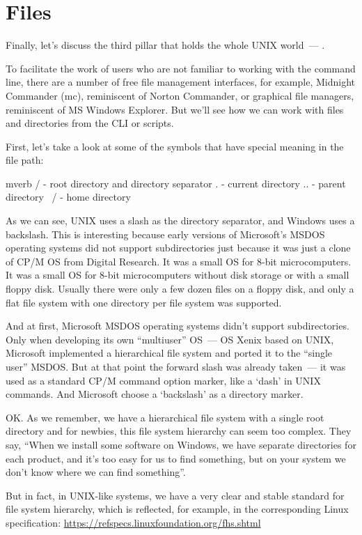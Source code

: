 \section*{Files}

Finally, let's discuss the third pillar that holds the whole UNIX world~---
.

To facilitate the work of users who are not familiar to working with
the command line, there are a number of free file management interfaces,
for example, Midnight Commander (mc), reminiscent of Norton Commander, or
graphical file managers, reminiscent of MS Windows Explorer. But we'll see
how we can work with files and directories from the CLI or scripts.

First, let's take a look at some of the symbols that have special meaning
in the file path:
\begin{code}{mverb}
/    - root directory and directory separator
.    - current directory
..  - parent directory
~/  - home directory
\end{code}

As we can see, UNIX uses a slash as the directory separator, and Windows
uses a backslash. This is interesting because early versions of Microsoft's
MSDOS operating systems did not support subdirectories just because it was just
a clone of CP/M OS from Digital Research. It was a small OS for 8-bit
microcomputers. It was a small OS for 8-bit microcomputers without disk storage
or with a small floppy disk. Usually there were only a few dozen files on
a floppy disk, and only a flat file system with one directory per file system
was supported.

And at first, Microsoft MSDOS operating systems didn't support subdirectories.
Only when developing its own ``multiuser'' OS~--- OS Xenix based on UNIX,
Microsoft implemented a hierarchical file system and ported it to
the ``single user'' MSDOS. But at that point the forward slash was already
taken~--- it was used as a standard CP/M command option marker,
like a `dash' in UNIX commands. And Microsoft choose a `backslash' as
a directory marker.

OK. As we remember, we have a hierarchical file system with a single root
directory and for newbies, this file system hierarchy can seem too complex.
They say, ``When we install some software on Windows, we have separate
directories for each product, and it's too easy for us to find something,
but on your system we don't know where we can find something''.

But in fact, in UNIX-like systems, we have a very clear and stable standard
for file system hierarchy, which is reflected, for example,
in the corresponding Linux specification:
\href{https://refspecs.linuxfoundation.org/fhs.shtml}{https://refspecs.linuxfoundation.org/fhs.shtml}

